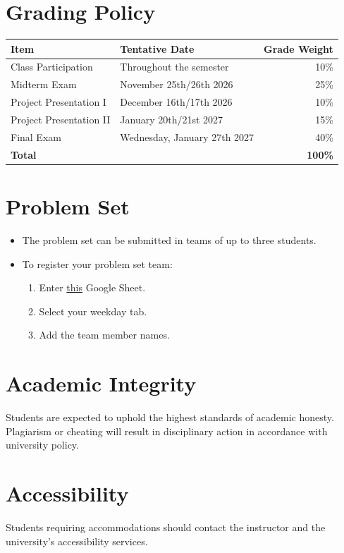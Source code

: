 \documentclass[11pt]{article}
\begin{document}
\section{Grading Policy}
\begin{tabular}{llr}
    \toprule
    \textbf{Item} & \textbf{Tentative Date} & \textbf{Grade Weight} \\
    \midrule
    Class Participation & Throughout the semester & 10\% \\
    Midterm Exam & November 25th/26th 2026 & 25\% \\
    Project Presentation I & December 16th/17th 2026 & 10\% \\
    Project Presentation II & January 20th/21st 2027 & 15\% \\
    Final Exam & Wednesday, January 27th 2027 & 40\% \\
    \midrule
    \textbf{Total} & & \textbf{100\%} \\
    \bottomrule
\end{tabular}

\section{Problem Set}
\begin{itemize}
    \item The problem set can be submitted in teams of up to three students.
    \item To register your problem set team:
    \begin{enumerate}
        \item Enter \href{https://docs.google.com/spreadsheets/d/1EELY5wWKEA_pHf_HXenjt4S6EhgivH2ieC7nghsS0EE/edit?usp=sharing}{this} Google Sheet.
        \item Select your weekday tab.
        \item Add the team member names.  
    \end{enumerate}
\end{itemize}

\section{Academic Integrity}
Students are expected to uphold the highest standards of academic honesty. Plagiarism or cheating will result in disciplinary action in accordance with university policy.

\section{Accessibility}
Students requiring accommodations should contact the instructor and the university’s accessibility services.
\end{document}
